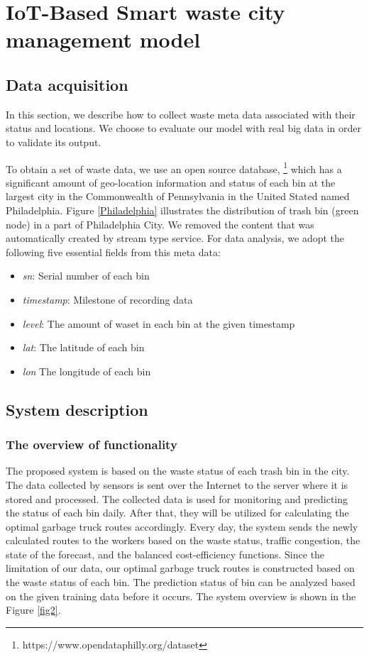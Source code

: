 \documentclass[conference,compsoc]{IEEEtran}
\begin{document}
\section{IoT-Based Smart waste city management model}

\subsection{Data acquisition} 
\label{dataacquisition}
In this section, we describe how to collect waste meta data associated with their status and locations. We choose to evaluate our model with real big data in order to validate its output.
\par To obtain a set of waste data, we use an open source database, \footnote{https://www.opendataphilly.org/dataset} which has a significant amount of geo-location information and status of each bin at the largest city in the Commonwealth of Pennsylvania in the United Stated named Philadelphia. Figure \ref{Philadelphia} illustrates the distribution of trash bin (green node) in a part of Philadelphia City. We removed the content that was automatically created by stream type service. For data analysis, we adopt the following five essential fields from this meta data:
\begin{itemize}
	\item \textit{sn}: Serial number of each bin
	\item \textit{timestamp}: Milestone of recording data
	\item \textit{level}: The amount of waset in each bin at the given timestamp
	\item \textit{lat}: The latitude of each bin
	\item \textit{lon} The longitude of each bin
\end{itemize}





\subsection{System description}
\label{systemdesciption}
\subsubsection{The overview of functionality}



The proposed system is based on the waste status of each trash bin in the city. The data collected by sensors is sent over the Internet to the server where it is stored and processed. The collected data is used for monitoring and predicting the status of each bin daily. After that, they will be utilized for calculating the optimal garbage truck routes accordingly. Every day, the system sends the newly calculated routes to the workers based on the waste status, traffic congestion, the state of the forecast, and the balanced cost-efficiency functions. Since the limitation of our data, our optimal garbage truck routes is constructed based on the waste status of each bin.  The prediction status of bin can be analyzed based on the given training data before it occurs. The system overview is shown in the Figure \ref{fig2}.
\end{document}
